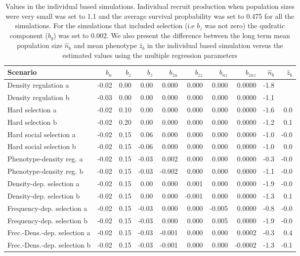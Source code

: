 \begin{table}[ht]
\centering
\begin{tabular}{lrrrrrrrrr}
  \hline
Scenario & $b_{n}$ & $b_{z}$ & $b_{\bar{z}}$ & $b_{\bar{z}n}$ & $b_{\bar{z}z}$ & $b_{nz}$ & $b_{\bar{z}nz}$ & $\hat{n}_{b}$ & $\hat{z}_{b}$ \\ 
  \hline
Density regulation a & -0.02 & 0.00 & 0.00 & 0.000 & 0.000 & 0.000 & 0.0000 & -1.8 &  \\ 
  Density regulation b & -0.03 & 0.00 & 0.00 & 0.000 & 0.000 & 0.000 & 0.0000 & -1.1 &  \\ 
  Hard selection a & -0.02 & 0.10 & 0.00 & 0.000 & 0.000 & 0.000 & 0.0000 & -1.6 & 0.0 \\ 
  Hard selection b & -0.02 & 0.20 & 0.00 & 0.000 & 0.000 & 0.000 & 0.0000 & -1.2 & 0.1 \\ 
  Hard social selection a & -0.02 & 0.15 & 0.06 & 0.000 & 0.000 & 0.000 & 0.0000 & -1.0 & -0.0 \\ 
  Hard social selection b & -0.02 & 0.15 & -0.06 & 0.000 & 0.000 & 0.000 & 0.0000 & -1.0 & 0.0 \\ 
  Phenotype-density reg. a & -0.02 & 0.15 & -0.03 & 0.002 & 0.000 & 0.000 & 0.0000 & -0.3 & -0.0 \\ 
  Phenotype-density reg. b & -0.02 & 0.15 & -0.03 & -0.002 & 0.000 & 0.000 & 0.0000 & -1.1 & -0.0 \\ 
  Density-dep. selection a & -0.02 & 0.15 & 0.00 & 0.000 & 0.001 & 0.000 & 0.0000 & -1.9 & -0.0 \\ 
  Density-dep. selection b & -0.02 & 0.15 & 0.00 & 0.000 & -0.001 & 0.000 & 0.0000 & -1.3 & 0.1 \\ 
  Frequency-dep. selection a & -0.02 & 0.15 & -0.03 & 0.000 & 0.000 & -0.005 & 0.0000 & -0.8 & -0.0 \\ 
  Frequency-dep. selection b & -0.02 & 0.15 & -0.03 & 0.000 & 0.000 & 0.005 & 0.0000 & -1.9 & -0.0 \\ 
  Frec.-Dens.-dep. selection a & -0.02 & 0.15 & -0.03 & -0.001 & 0.000 & 0.000 & 0.0002 & -0.3 & 0.4 \\ 
  Frec.-Dens.-dep. selection b & -0.02 & 0.15 & -0.03 & -0.001 & 0.000 & 0.000 & -0.0002 & -1.3 & -0.1 \\ 
   \hline
\end{tabular}
\caption{Values in the individual based simulations. Individual recruit production when population sizes were very small was set to 1.1 and the average survival propbability was set to 0.475 for all the simulations. For the simulations that included selection (i.e $b_z$ was not zero) the qudratic component ($b_q$) was set to 0.002. We also present the difference between the long term mean population size $\hat{n}_{b}$  and mean phenotype  $\hat{z}_b$ in the individual based simulation versus the estimated values using the multiple regression parameters} 
\end{table}
